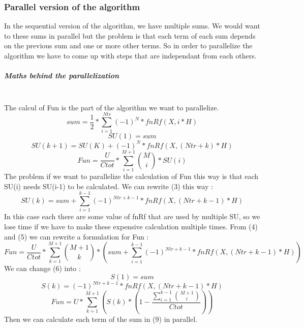 \documentclass[11pt,a4paper]{article}
\begin{document}
\subsubsection{Parallel version of the algorithm}

In the sequential version of the algorithm, we have multiple sums. We would want to these sums in parallel but the problem is that each term of each sum depends on the previous sum and one or more other terms. So in order to parallelize the algorithm we have to come up with steps that are independant from each others.

\subparagraph{Maths behind the parallelization}
~~\\
The calcul of Fun is the part of the algorithm we want to parallelize.
\begin{equation}
	sum = \frac{1}{2} *  \sum_{i=1}^{Ntr} (-1)^N*fnRf(X,i*H)
\end{equation}
\begin{equation}
	SU(1) = sum
\end{equation}
\begin{equation}
	SU(k + 1) = SU(K) + (-1)^N*fnRf(X,(Ntr + k)*H)
\end{equation}
\begin{equation}
	Fun = \frac{U}{Ctot} * \sum_{i=1}^{M+1} \binom{M}{i}*SU(i)
\end{equation}
The problem if we want to parallelize the calculation of Fun this way is that each SU(i) needs SU(i-1) to be calculated.
We can rewrite (3) this way :
\begin{equation}
	SU(k) = sum + \sum_{i=1}^{k-1} (-1)^{Ntr+k-1}*fnRf(X,(Ntr + k-1)*H)
\end{equation}
In this case each there are some value of fnRf that are used by multiple SU, so we lose time if we have to make these expensive calculation multiple times.
From (4) and (5) we can rewrite a formulation for Fun :
\begin{equation}
	Fun = \frac{U}{Ctot} * \sum_{k=1}^{M+1} \binom{M+1}{k}*(sum + \sum_{i=1}^{k-1} (-1)^{Ntr+k-1}*fnRf(X,(Ntr + k-1)*H))
\end{equation}
We can change (6) into :
\begin{equation}
	S(1) = sum
\end{equation}
\begin{equation}
	S(k) = (-1)^{Ntr+k-1}*fnRf(X,(Ntr + k-1)*H)
\end{equation}
\begin{equation}
	Fun = U *\sum_{k=1}^{M+1}(S(k)*(1-\frac{ \sum_{i=1}^{k-1} \binom{M+1}{i}}{Ctot}))
\end{equation}
Then we can calculate each term of the sum in (9) in parallel.
\end{document}
